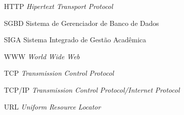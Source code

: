 \begin{siglas}
  \item[HTTP] \textit{Hipertext Transport Protocol}
  \item[SGBD] Sistema de Gerenciador de Banco de Dados
  \item[SIGA] Sistema Integrado de Gestão Acadêmica
  \item[WWW] \textit{World Wide Web}
  \item[TCP] \textit{Transmission Control Protocol}
  \item[TCP/IP] \textit{Transmission Control Protocol/Internet Protocol	}
  \item[URL] \textit{Uniform Resource Locator}
\end{siglas}